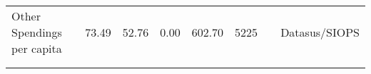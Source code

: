 \begin{table}[H]
\begin{footnotesize}
\begin{center}
{\begin{threeparttable}[b]
\begin{tabular}{rrrrrrrr}
    \multicolumn{1}{l}{Other Spendings per capita} & \multicolumn{1}{c}{73.49} & \multicolumn{1}{c}{52.76} & \multicolumn{1}{c}{0.00} & \multicolumn{1}{c}{602.70} & \multicolumn{1}{c}{5225} &       & \multicolumn{1}{c}{Datasus/SIOPS} \\
          &       &       &       &       &       &       &  \\
    \midrule
    \midrule
          &       &       &       &       &       &       &  \\
    \end{tabular}%
    
  \label{table:stats}%

\end{threeparttable}
}
\end{center}
\end{footnotesize}
\end{table}
